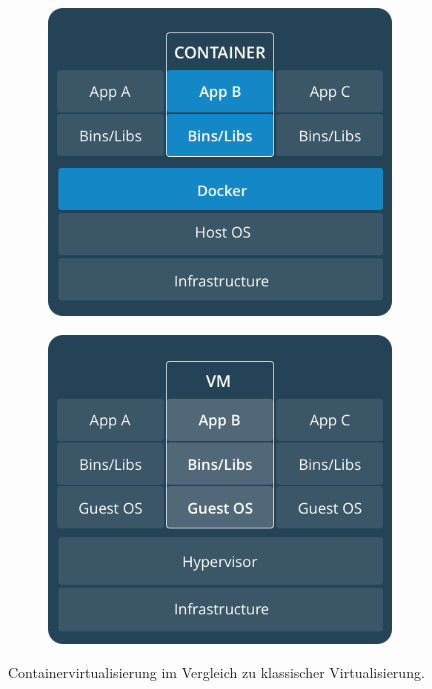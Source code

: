 \documentclass[12pt,a4paper]{scrartcl}
\begin{document}
\begin{figure}[h!]
\centering
	\begin{subfigure}{0.4\linewidth}
		\includegraphics[scale=0.2]{DockerContainer.png} 
	\end{subfigure}
	\hspace*{1 cm}
	\begin{subfigure}{0.4\linewidth}
    	\includegraphics[scale=0.2]{DockerVM.png}
	\end{subfigure}
	\caption[https://docs.docker.com/get-started/ (Stand 25.09.2020)]{Containervirtualisierung im Vergleich zu klassischer Virtualisierung.}
\end{figure}
\end{document}
